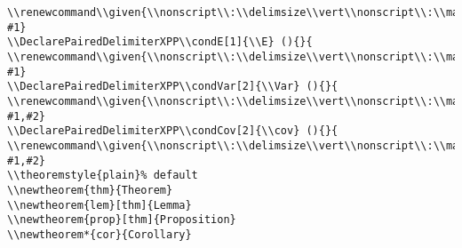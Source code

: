 \documentclass[c]{article}
\DeclareMathOperator{\Var}{Var}
\DeclareMathOperator{\cov}{Cov}
\DeclareMathOperator{\E}{\mathbb{E}}
\providecommand\given{}
\renewcommand\given{\nonscript\:\delimsize\vert\nonscript\:\mathopen{}}
\renewcommand\given{\nonscript\:\delimsize\vert\nonscript\:\mathopen{}}
\renewcommand\given{\nonscript\:\delimsize\vert\nonscript\:\mathopen{}}
\renewcommand\given{\nonscript\:\delimsize\vert\nonscript\:\mathopen{}}
\theoremstyle{plain}%
\theoremstyle{definition}
\theoremstyle{remark}
\begin{document}
\begin{verbatim}
\\renewcommand\\given{\\nonscript\\:\\delimsize\\vert\\nonscript\\:\\mathopen{}}
#1}
\\DeclarePairedDelimiterXPP\\condE[1]{\\E} (){}{
\\renewcommand\\given{\\nonscript\\:\\delimsize\\vert\\nonscript\\:\\mathopen{}}
#1}
\\DeclarePairedDelimiterXPP\\condVar[2]{\\Var} (){}{
\\renewcommand\\given{\\nonscript\\:\\delimsize\\vert\\nonscript\\:\\mathopen{}}
#1,#2}
\\DeclarePairedDelimiterXPP\\condCov[2]{\\cov} (){}{
\\renewcommand\\given{\\nonscript\\:\\delimsize\\vert\\nonscript\\:\\mathopen{}}
#1,#2}
\\theoremstyle{plain}% default
\\newtheorem{thm}{Theorem}
\\newtheorem{lem}[thm]{Lemma}
\\newtheorem{prop}[thm]{Proposition}
\\newtheorem*{cor}{Corollary}

\end{verbatim}
\end{document}
